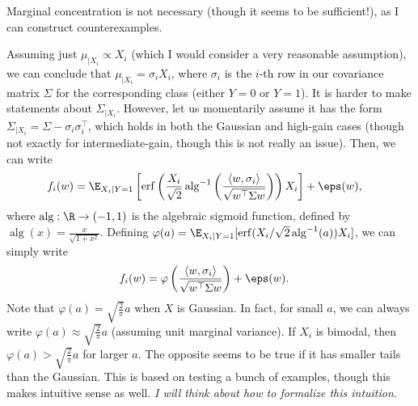 Marginal concentration is not necessary (though it seems to be sufficient!), as I can construct counterexamples.

Assuming just $\mu_{\mid X_i} \propto X_i$ (which I would consider a very reasonable assumption), we can conclude that $\mu_{\mid X_i} = \sigma_i X_i$, where $\sigma_i$ is the $i$-th row in our covariance matrix $\Sigma$ for the corresponding class (either $Y=0$ or $Y=1$).
It is harder to make statements about $\Sigma_{\mid X_i}$.
However, let us momentarily assume it has the form $\Sigma_{\mid X_i} = \Sigma - \sigma_i \sigma_i^\top$, which holds in both the Gaussian and high-gain cases (though not exactly for intermediate-gain, though this is not really an issue).
Then, we can write 
\begin{align}
    f_i(w) 
    &= \E_{X_i \mid Y=1} \left[ \operatorname{erf}\left( \frac{X_i}{\sqrt{2}} \operatorname{alg}^{-1} \left( \frac{\langle w, \sigma_i \rangle}{\sqrt{w^\top \Sigma w}} \right) \right) X_i \right] + \eps(w),
\end{align}
where $\operatorname{alg} : \R \to (-1, 1)$ is the algebraic sigmoid function, defined by $\operatorname{alg}(x) = \frac{x}{\sqrt{1+x^2}}$.
Defining $\varphi(a) = \E_{X_i \mid Y=1} [ \operatorname{erf}( X_i / \sqrt{2} \operatorname{alg}^{-1} ( a ) ) X_i ]$, we can simply write
\begin{align}
    f_i(w) 
    &= \varphi \left( \frac{\langle w, \sigma_i \rangle}{\sqrt{w^\top \Sigma w}} \right) + \eps(w).
\end{align}
Note that $\varphi(a) = \sqrt{\frac{2}{\pi}} a$ when $X$ is Gaussian.
In fact, for small $a$, we can always write $\varphi(a) \approx \sqrt{\frac{2}{\pi}} a$ (assuming unit marginal variance).
If $X_i$ is bimodal, then $\varphi(a) > \sqrt{\frac{2}{\pi}} a$ for larger $a$.
The opposite seems to be true if it has smaller tails than the Gaussian.
This is based on testing a bunch of examples, though this makes intuitive sense as well.
\emph{I will think about how to formalize this intuition.}

